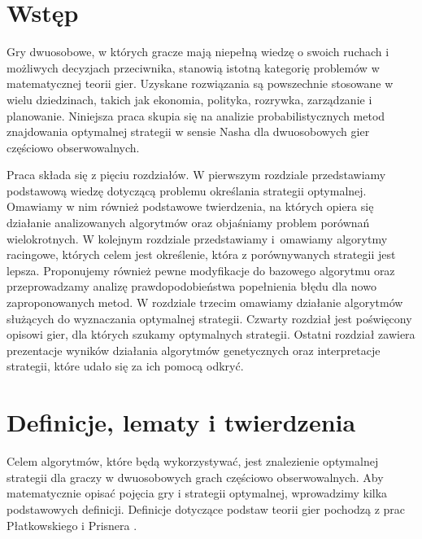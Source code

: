 \documentclass[inzynierska]{pwr_wmat_praca_dyplomowa}
\theoremstyle{plain}
\numberwithin{theorem}{chapter}
\theoremstyle{definition}
\numberwithin{theorem}{chapter}
\begin{document}
\frontmatter
\maketitle
\mainmatter
\tableofcontents
{\backmatter \chapter{Wstęp}} 
Gry dwuosobowe, w których gracze mają niepełną wiedzę o swoich ruchach i możliwych decyzjach przeciwnika, stanowią istotną kategorię problemów w matematycznej teorii gier. Uzyskane rozwiązania są powszechnie stosowane w wielu dziedzinach, takich jak ekonomia, polityka, rozrywka, zarządzanie i planowanie.
Niniejsza praca skupia się na analizie probabilistycznych metod znajdowania optymalnej strategii w sensie Nasha \cite{Von_Stengel_2002} dla dwuosobowych gier częściowo obserwowalnych.

Praca składa się z pięciu rozdziałów. W pierwszym rozdziale przedstawiamy podstawową wiedzę dotyczącą problemu określania strategii optymalnej. Omawiamy w nim również podstawowe twierdzenia, na których opiera się działanie analizowanych algorytmów oraz objaśniamy problem porównań wielokrotnych. W kolejnym rozdziale przedstawiamy i~omawiamy algorytmy racingowe, których celem jest określenie, która z porównywanych strategii jest lepsza. Proponujemy również pewne modyfikacje do bazowego algorytmu oraz przeprowadzamy analizę prawdopodobieństwa popełnienia błędu dla nowo zaproponowanych metod. W rozdziale trzecim omawiamy działanie algorytmów służących do wyznaczania optymalnej strategii. Czwarty rozdział jest poświęcony opisowi gier, dla których szukamy optymalnych strategii. Ostatni rozdział zawiera prezentacje wyników działania algorytmów genetycznych oraz interpretacje strategii, które udało się za ich pomocą odkryć.

\chapter{Definicje, lematy i twierdzenia}
Celem algorytmów, które będą wykorzystywać, jest znalezienie optymalnej strategii dla graczy w dwuosobowych grach częściowo obserwowalnych. Aby matematycznie opisać pojęcia gry i strategii optymalnej, wprowadzimy kilka podstawowych definicji.
Definicje dotyczące podstaw teorii gier pochodzą z prac Płatkowskiego \cite{platkowski2012wstkep} i Prisnera \cite{prisner2014game}.
\end{document}
